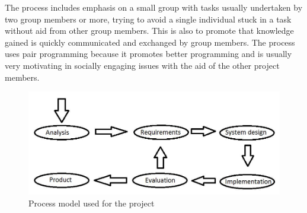The process includes emphasis on a small group with tasks usually undertaken by two group members or more, trying to avoid a single individual stuck in a task without aid from other group members. This is also to promote that knowledge gained is quickly communicated and exchanged by group members. The process uses pair programming because it promotes better programming and is usually very motivating in socially engaging issues with the aid of the other project members.

\begin{figure}[h]
\centering
\includegraphics[scale=0.35]{billeder/process-model}
\caption{Process model used for the project}
\label{pm}
\end{figure}


